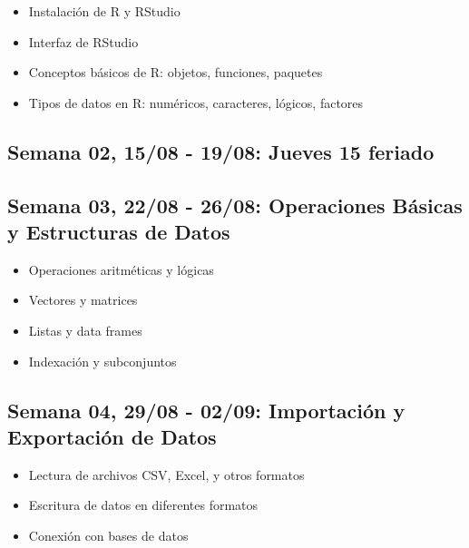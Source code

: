 \documentclass[11pt,letter,]{article}
\providecommand{\tightlist}{%
  \setlength{\itemsep}{0pt}\setlength{\parskip}{0pt}}
\begin{document}
\begin{itemize}
\tightlist
\item
  Instalación de R y RStudio
\item
  Interfaz de RStudio
\item
  Conceptos básicos de R: objetos, funciones, paquetes
\item
  Tipos de datos en R: numéricos, caracteres, lógicos, factores
\end{itemize}

\hypertarget{semana-02-1508---1908-jueves-15-feriado}{%
\subsection{Semana 02, 15/08 - 19/08: Jueves 15
feriado}\label{semana-02-1508---1908-jueves-15-feriado}}

\hypertarget{semana-03-2208---2608-operaciones-buxe1sicas-y-estructuras-de-datos}{%
\subsection{Semana 03, 22/08 - 26/08: Operaciones Básicas y Estructuras
de
Datos}\label{semana-03-2208---2608-operaciones-buxe1sicas-y-estructuras-de-datos}}

\begin{itemize}
\tightlist
\item
  Operaciones aritméticas y lógicas
\item
  Vectores y matrices
\item
  Listas y data frames
\item
  Indexación y subconjuntos
\end{itemize}

\hypertarget{semana-04-2908---0209-importaciuxf3n-y-exportaciuxf3n-de-datos}{%
\subsection{Semana 04, 29/08 - 02/09: Importación y Exportación de
Datos}\label{semana-04-2908---0209-importaciuxf3n-y-exportaciuxf3n-de-datos}}

\begin{itemize}
\tightlist
\item
  Lectura de archivos CSV, Excel, y otros formatos
\item
  Escritura de datos en diferentes formatos
\item
  Conexión con bases de datos
\end{itemize}
\end{document}
